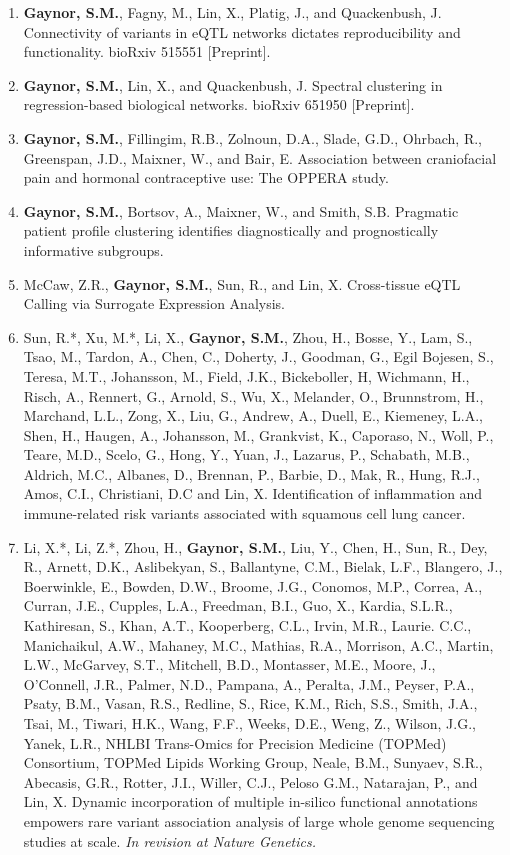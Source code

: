\documentclass[10pt]{article}
\begin{document}
\begin{enumerate}
\item \textbf{Gaynor, S.M.}, Fagny, M., Lin, X., Platig, J., and Quackenbush, J. Connectivity of variants in eQTL networks dictates reproducibility and functionality. bioRxiv 515551 [Preprint].  
\item \textbf{Gaynor, S.M.}, Lin, X., and Quackenbush, J. Spectral clustering in regression-based biological networks. bioRxiv 651950 [Preprint].
\item \textbf{Gaynor, S.M.}, Fillingim, R.B., Zolnoun, D.A., Slade, G.D., Ohrbach, R., Greenspan, J.D., Maixner, W.,  and Bair, E. Association between craniofacial pain and hormonal contraceptive use: The OPPERA study.
\item \textbf{Gaynor, S.M.}, Bortsov, A., Maixner, W.,  and Smith, S.B. Pragmatic patient profile clustering identifies diagnostically and prognostically informative subgroups.
\item McCaw, Z.R., \textbf{Gaynor, S.M.}, Sun, R.,  and Lin, X. Cross-tissue eQTL Calling via Surrogate Expression Analysis.
\item Sun, R.*, Xu, M.*, Li, X., \textbf{Gaynor, S.M.}, Zhou, H., Bosse, Y., Lam, S., Tsao, M., Tardon, A., Chen, C., Doherty, J., Goodman, G., Egil Bojesen, S., Teresa, M.T., Johansson, M., Field, J.K., Bickeboller, H, Wichmann, H., Risch, A., Rennert, G., Arnold, S., Wu, X., Melander, O., Brunnstrom, H.,
Marchand, L.L., Zong, X., Liu, G., Andrew, A., Duell, E., Kiemeney, L.A., Shen, H., Haugen, A.,
Johansson, M., Grankvist, K., Caporaso, N., Woll, P., Teare, M.D., Scelo, G., Hong, Y., Yuan, J.,
Lazarus, P., Schabath, M.B., Aldrich, M.C., Albanes, D., Brennan, P., Barbie, D., Mak, R., Hung,
R.J., Amos, C.I., Christiani, D.C and Lin, X. Identification of inflammation and immune-related risk variants associated with squamous cell lung cancer.
\item Li, X.*, Li, Z.*, Zhou, H., \textbf{Gaynor, S.M.}, Liu, Y., Chen, H., Sun, R., Dey, R., Arnett, D.K., Aslibekyan, S., Ballantyne, C.M., Bielak, L.F., Blangero, J., Boerwinkle, E., Bowden, D.W., Broome, J.G., Conomos, M.P., Correa, A., Curran, J.E., Cupples, L.A., Freedman, B.I.,  Guo, X., Kardia, S.L.R., Kathiresan, S., Khan, A.T.,  Kooperberg, C.L., Irvin, M.R., Laurie. C.C., Manichaikul, A.W., Mahaney, M.C., Mathias, R.A., Morrison, A.C., Martin, L.W., McGarvey, S.T., Mitchell, B.D., Montasser, M.E.,  Moore, J.,  O’Connell, J.R., Palmer, N.D., Pampana, A.,  Peralta, J.M.,  Peyser, P.A.,  Psaty, B.M., Vasan, R.S., Redline, S., Rice, K.M., Rich, S.S., Smith, J.A.,  Tsai, M., Tiwari, H.K., Wang, F.F., Weeks, D.E., Weng, Z., Wilson, J.G., Yanek, L.R., NHLBI Trans-Omics for Precision Medicine (TOPMed) Consortium, TOPMed Lipids Working Group, Neale, B.M., Sunyaev, S.R., Abecasis, G.R.,  Rotter, J.I.,  Willer, C.J., Peloso G.M., Natarajan, P., and Lin, X. Dynamic incorporation of multiple in-silico functional annotations empowers rare variant association analysis of large whole genome sequencing studies at scale. \textit{In revision at Nature Genetics.}

\end{enumerate}
\end{document}
